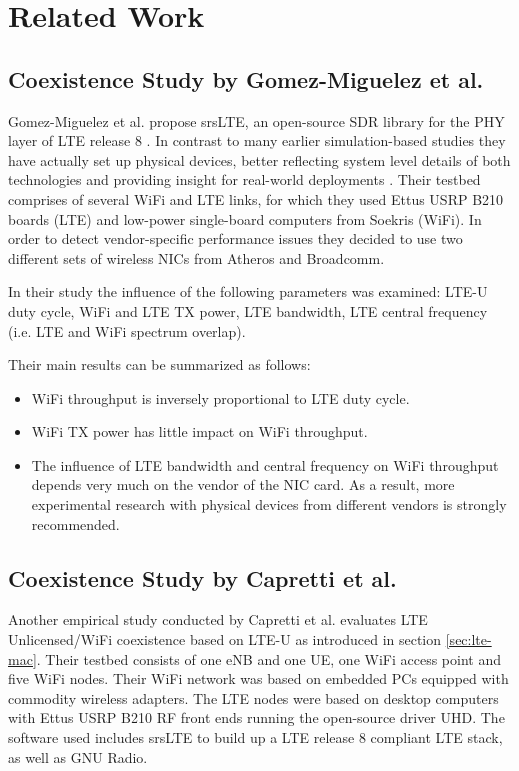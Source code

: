 \chapter{Related Work}

\section{Coexistence Study by Gomez-Miguelez et al.}

Gomez-Miguelez et al. propose srsLTE, an open-source SDR library for the PHY layer of LTE release 8 \cite{gomezmiguelez16}. In contrast to many earlier simulation-based studies they have actually set up physical devices, better reflecting system level details of both technologies and providing insight for real-world deployments \cite{rupasinghe14} \cite{nihtilä13} \cite{jeon14} \cite{cavalcante13} . Their testbed comprises of several WiFi and LTE links, for which they used Ettus USRP B210 boards (LTE) and low-power single-board computers from Soekris (WiFi). In order to detect vendor-specific performance issues they decided to use two different sets of wireless NICs from Atheros and Broadcomm.

In their study the influence of the following parameters was examined: LTE-U duty cycle, WiFi and LTE TX power, LTE bandwidth, LTE central frequency (i.e. LTE and WiFi spectrum overlap).

Their main results can be summarized as follows:

\begin{itemize}
	\item WiFi throughput is inversely proportional to LTE duty cycle.
	\item WiFi TX power has little impact on WiFi throughput.
	\item The influence of LTE bandwidth and central frequency on WiFi throughput depends very much on the vendor of the NIC card. As a result, more experimental research with physical devices from different vendors is strongly recommended. 
\end{itemize}

\section{Coexistence Study by Capretti et al.}

Another empirical study \cite{capretti16} conducted by Capretti et al. evaluates LTE Unlicensed/WiFi coexistence based on LTE-U as introduced in section \ref{sec:lte-mac}.  Their testbed consists of one eNB and one UE, one WiFi access point and five WiFi nodes. Their WiFi network was based on embedded PCs equipped with commodity wireless adapters. The LTE nodes were based on desktop computers with Ettus USRP B210 RF front ends running the open-source driver UHD. The software used includes srsLTE to build up a LTE release 8 compliant LTE stack, as well as GNU Radio. 

